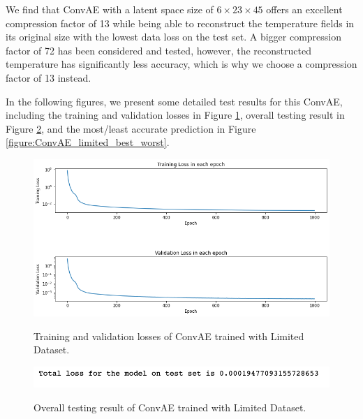 We find that ConvAE with a latent space size of $6 \times 23 \times 45$ offers an excellent compression factor of 13 while being able to reconstruct the temperature fields in its original size with the lowest data loss on the test set. A bigger compression factor of 72 has been considered and tested, however, the reconstructed temperature has significantly less accuracy, which is why we choose a compression factor of 13 instead.

In the following figures, we present some detailed test results for this ConvAE, including the training and validation losses in Figure \ref{figure:ConvAE_limited_losses}, overall testing result in Figure \ref{figure:ConvAE_limited_testing}, and the most/least accurate prediction in 
Figure \ref{figure:ConvAE_limited_best_worst}.

\begin{figure}[H]
    \caption{Training and validation losses of ConvAE trained with Limited Dataset.}
    \includegraphics[scale=0.6]{figures/mantle_convection_images/limited_dataset/ConvAE_trainingData.png}
    \label{figure:ConvAE_limited_losses}
\end{figure}

\begin{figure}[H]
    \caption{Overall testing result of ConvAE trained with Limited Dataset.}
    \includegraphics[scale=0.8]{figures/mantle_convection_images/limited_dataset/ConvAE_OverallTesting.png}
    \label{figure:ConvAE_limited_testing}
\end{figure}

